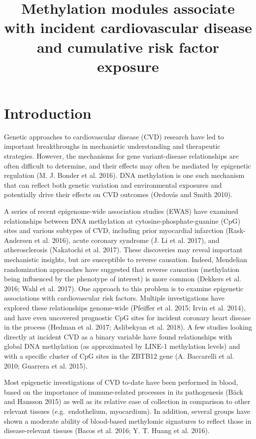 \documentclass[]{article}
\title{Methylation modules associate with incident cardiovascular disease and
cumulative risk factor exposure}
\author{}
\date{}
\theoremstyle{definition}
\theoremstyle{definition}
\theoremstyle{definition}
\theoremstyle{remark}
\begin{document}
\maketitle


\section{Introduction}\label{introduction}

Genetic approaches to cardiovascular disease (CVD) research have led to
important breakthroughs in mechanistic understanding and therapeutic
strategies. However, the mechanisms for gene variant-disease
relationships are often difficult to determine, and their effects may
often be mediated by epigenetic regulation (M. J. Bonder et al. 2016).
DNA methylation is one such mechanism that can reflect both genetic
variation and environmental exposures and potentially drive their
effects on CVD outcomes (Ordov{á}s and Smith 2010).

A series of recent epigenome-wide association studies (EWAS) have
examined relationships between DNA methylation at
cytosine-phosphate-guanine (CpG) sites and various subtypes of CVD,
including prior myocardial infarction (Rask-Andersen et al. 2016), acute
coronary syndrome (J. Li et al. 2017), and atherosclerosis (Nakatochi et
al. 2017). These discoveries may reveal important mechanistic insights,
but are susceptible to reverse causation. Indeed, Mendelian
randomization approaches have suggested that reverse causation
(methylation being influenced by the phenotype of interest) is more
common (Dekkers et al. 2016; Wahl et al. 2017). One approach to this
problem is to examine epigenetic associations with cardiovascular risk
factors. Multiple investigations have explored these relationships
genome-wide (Pfeiffer et al. 2015; Irvin et al. 2014), and have even
uncovered prognostic CpG sites for incident coronary heart disease in
the process (Hedman et al. 2017; Aslibekyan et al. 2018). A few studies
looking directly at incident CVD as a binary variable have found
relationships with global DNA methylation (as approximated by LINE-1
methylation levels) and with a specific cluster of CpG sites in the
ZBTB12 gene (A. Baccarelli et al. 2010; Guarrera et al. 2015).

Most epigenetic investigations of CVD to-date have been performed in
blood, based on the importance of immune-related processes in its
pathogenesis (B{ä}ck and Hansson 2015) as well as its relative ease of
collection in comparison to other relevant tissues (e.g.~endothelium,
myocardium). In addition, several groups have shown a moderate ability
of blood-based methylomic signatures to reflect those in
disease-relevant tissues (Bacos et al. 2016; Y. T. Huang et al. 2016).
\end{document}
